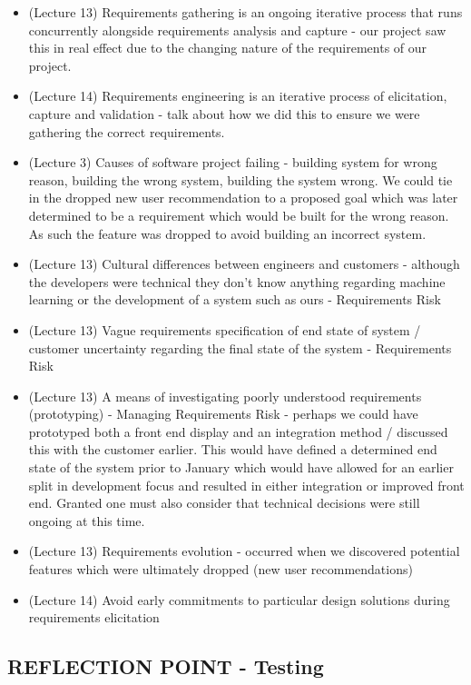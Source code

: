 \documentclass{l3proj}
\begin{document}
\begin{itemize}
\item (Lecture 13) Requirements gathering is an ongoing iterative process that runs concurrently alongside requirements analysis and capture - our project saw this in real effect due to the changing nature of the requirements of our project.
\item (Lecture 14) Requirements engineering is an iterative process of elicitation, capture and validation - talk about how we did this to ensure we were gathering the correct requirements.
\item (Lecture 3) Causes of software project failing - building system for wrong reason, building the wrong system, building the system wrong. We could tie in the dropped new user recommendation to a proposed goal which was later determined to be a requirement which would be built for the wrong reason. As such the feature was dropped to avoid building an incorrect system.
\item (Lecture 13) Cultural differences between engineers and customers - although the developers were technical they don’t know anything regarding machine learning or the development of a system such as ours - Requirements Risk
\item (Lecture 13) Vague requirements specification of end state of system / customer uncertainty regarding the final state of the system - Requirements Risk
\item (Lecture 13) A means of investigating poorly understood requirements (prototyping) - Managing Requirements Risk - perhaps we could have prototyped both a front end display and an integration method / discussed this with the customer earlier. This would have defined a determined end state of the system prior to January which would have allowed for an earlier split in development focus and resulted in either integration or improved front end. Granted one must also consider that technical decisions were still ongoing at this time.
\item (Lecture 13) Requirements evolution - occurred when we discovered potential features which were ultimately dropped (new user recommendations)
\item (Lecture 14) Avoid early commitments to particular design solutions during requirements elicitation
\end{itemize}


\subsection{REFLECTION POINT - Testing}
\label{testing}
\end{document}
